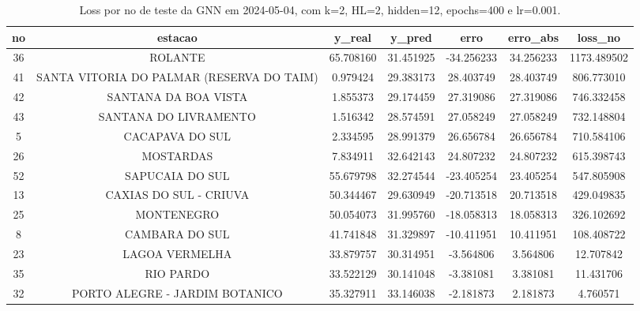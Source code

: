 \begin{table}[h]
\centering
\caption{Loss por no de teste da GNN em 2024-05-04, com k=2, HL=2, hidden=12, epochs=400 e lr=0.001.}
\label{tab:gnn_loss_k2_hl2_h12_e400_d20240504}
\begin{tabular}{ccccccc}
\toprule
no & estacao & y\_real & y\_pred & erro & erro\_abs & loss\_no \\
\midrule
36 & ROLANTE & 65.708160 & 31.451925 & -34.256233 & 34.256233 & 1173.489502 \\
41 & SANTA VITORIA DO PALMAR (RESERVA DO TAIM) & 0.979424 & 29.383173 & 28.403749 & 28.403749 & 806.773010 \\
42 & SANTANA DA BOA VISTA & 1.855373 & 29.174459 & 27.319086 & 27.319086 & 746.332458 \\
43 & SANTANA DO LIVRAMENTO & 1.516342 & 28.574591 & 27.058249 & 27.058249 & 732.148804 \\
5 & CACAPAVA DO SUL & 2.334595 & 28.991379 & 26.656784 & 26.656784 & 710.584106 \\
26 & MOSTARDAS & 7.834911 & 32.642143 & 24.807232 & 24.807232 & 615.398743 \\
52 & SAPUCAIA DO SUL & 55.679798 & 32.274544 & -23.405254 & 23.405254 & 547.805908 \\
13 & CAXIAS DO SUL - CRIUVA & 50.344467 & 29.630949 & -20.713518 & 20.713518 & 429.049835 \\
25 & MONTENEGRO & 50.054073 & 31.995760 & -18.058313 & 18.058313 & 326.102692 \\
8 & CAMBARA DO SUL & 41.741848 & 31.329897 & -10.411951 & 10.411951 & 108.408722 \\
23 & LAGOA VERMELHA & 33.879757 & 30.314951 & -3.564806 & 3.564806 & 12.707842 \\
35 & RIO PARDO & 33.522129 & 30.141048 & -3.381081 & 3.381081 & 11.431706 \\
32 & PORTO ALEGRE - JARDIM BOTANICO & 35.327911 & 33.146038 & -2.181873 & 2.181873 & 4.760571 \\
\bottomrule
\end{tabular}
\end{table}
